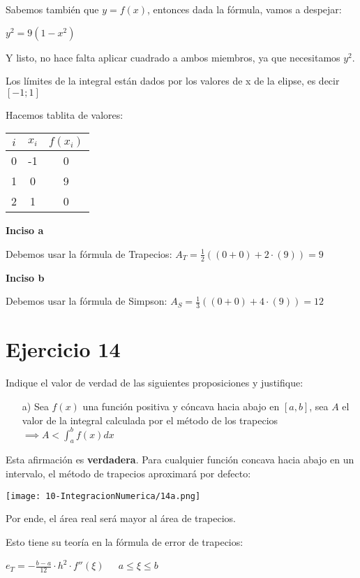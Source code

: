 \documentclass[11pt]{article}
\begin{document}
	Sabemos también que $y=f(x)$, entonces dada la fórmula, vamos a despejar:
	
	$y^2=9(1-x^2)$
	
	Y listo, no hace falta aplicar cuadrado a ambos miembros, ya que necesitamos $y^2$.
	
	Los límites de la integral están dados por los valores de x de la elipse, es decir $[-1;1]$
	
	Hacemos tablita de valores:
	
	\begin{tabular}{|c|c|c|}
		\hline
		$i$ & $x_i$ & $f(x_i)$ \\
		\hline
		0 & -1 & 0 \\
		\hline
		1 & 0 & 9 \\
		\hline
		2 & 1 & 0 \\
		\hline
	\end{tabular}

	\textbf{Inciso a}
	
	Debemos usar la fórmula de Trapecios: $\displaystyle A_T=\frac{1}{2}((0+0)+2\cdot(9))=9$
	
	\textbf{Inciso b}

	Debemos usar la fórmula de Simpson: $\displaystyle A_S=\frac{1}{3}((0+0)+4\cdot(9))=12$
	
	\section{Ejercicio 14}
	Indique el valor de verdad de las siguientes proposiciones y justifique:
	
	\begin{itemize}
		\item[a)] Sea $f(x)$ una función positiva y cóncava hacia abajo en $[a,b]$, sea $A$ el valor de la integral calculada por el método de los trapecios $\displaystyle \implies A<\int_{a}^{b}f(x)dx$
	\end{itemize}
		
		Esta afirmación es \textbf{verdadera}. Para cualquier función concava hacia abajo en un intervalo, el método de trapecios aproximará por defecto:
		
		\texttt{[image: 10-IntegracionNumerica/14a.png]}
		
		Por ende, el área real será mayor al área de trapecios.
		
		Esto tiene su teoría en la fórmula de error de trapecios:
		
		$\displaystyle e_T=-\frac{b-a}{12}\cdot h^2 \cdot f''(\xi)$ $\;\;\;\; a\le \xi \le b$
		
\end{document}

